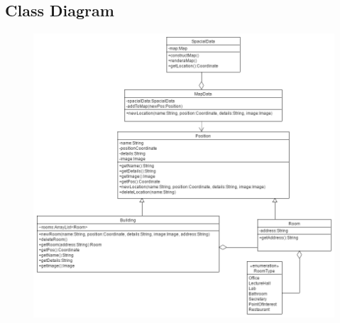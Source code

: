 \subsection{Class Diagram}
\begin{figure}[H]
	\includegraphics[width=\textwidth]{GIS/GIS_Class_Diagram.png}
\end{figure}